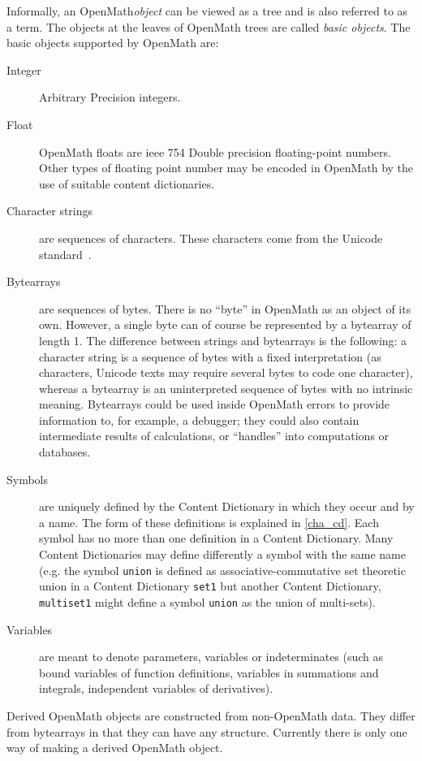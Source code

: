 \documentclass{report}
\def\textquote#1{``#1''}
\def\OM{OpenMath\xspace}
\def\acronym#1{\textsf{#1}}
\begin{document}
Informally, an \OM \emph{object} can be
viewed as a tree and is also referred to as a term.  The objects at
the leaves of \OM trees are called \emph{basic
objects}.  The basic objects supported by \OM are:
\begin{description}
\item[Integer]  Arbitrary Precision
integers.
\item[Float] \OM floats are \acronym{ieee} 754 Double precision floating-point
  numbers. Other types of floating point number may be encoded in \OM by the use of
  suitable content dictionaries.
\item[Character strings]are sequences of characters. These characters come from the
  Unicode standard~\cite{UNICODE}.
\item[Bytearrays] are sequences of bytes. There is no \textquote{byte} in \OM as an object
  of its own. However, a single byte can of course be represented by a bytearray of length
  1.  The difference between strings and bytearrays is the following: a character string
  is a sequence of bytes with a fixed interpretation (as characters, Unicode texts may
  require several bytes to code one character), whereas a bytearray is an uninterpreted
  sequence of bytes with no intrinsic meaning.  Bytearrays could be used inside \OM errors
  to provide information to, for example, a debugger; they could also contain intermediate
  results of calculations, or \textquote{handles} into computations or databases.
\item[Symbols] are uniquely defined by the Content Dictionary in which they occur and by a
  name.  The form of these definitions is explained in \ref{cha_cd}.  Each symbol has no
  more than one definition in a Content Dictionary. Many Content Dictionaries may define
  differently a symbol with the same name (e.g. the symbol \lstinline|union| is defined
  as associative-commutative set theoretic union in a Content Dictionary \lstinline|set1|
  but another Content Dictionary, \lstinline|multiset1| might define a symbol
  \lstinline|union| as the union of multi-sets).
\item[Variables] are meant to denote parameters, variables or indeterminates (such as
  bound variables of function definitions, variables in summations and integrals,
  independent variables of derivatives).
\end{description} 
Derived \OM objects are constructed from non-\OM data.  They differ from bytearrays in
that they can have any structure.  Currently there is only one way of making a derived \OM
object.
\end{document}
